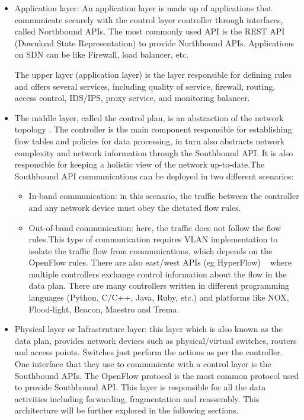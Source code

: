 \documentclass[
  oneside,
  11pt, a4paper,
  footinclude=true,
  headinclude=true,
  cleardoublepage=empty
]{scrbook}
\begin{document}
\begin{itemize}
    \item 
    Application layer: An application layer is made up of applications that communicate securely with the control layer controller through interfaces, called Northbound APIs. The most commonly used API is the REST API (Download State Representation) to provide Northbound APIs. Applications on SDN can be like Firewall, load balancer, etc.
    
    The upper layer (application layer) is the layer responsible for defining rules and offers several services, including quality of service, firewall, routing, access control, IDS/IPS, proxy service, and monitoring balancer.\par
    
    \item
    
    The middle layer, called the control plan, is an abstraction of the network topology . The controller is the main component responsible for establishing flow tables and policies for data processing, in turn also abstracts network complexity and network information through the Southbound API. It is also responsible for keeping  a holistic view of the network up-to-date.The Southbound API communications can be deployed in two different scenarios:

\begin{itemize}
    \item 
    In-band communication: in this scenario, the traffic between the controller and any network device must obey the dictated flow rules. \par
    \item Out-of-band communication: here, the traffic does not follow the flow rules.This type of communication requires VLAN implementation to isolate the traffic flow from communications, which depends on the OpenFlow rules. There are also east/west APIs (eg HyperFlow) ~\cite{hyperflow} where multiple controllers exchange control information about the flow in the data plan. There are many controllers written in different programming languages (Python, C/C++, Java, Ruby, etc.) and platforms like NOX, Flood-light, Beacon, Maestro and Trema.
\end{itemize}

    \item
    Physical layer or Infrastruture layer: this layer which is also known as the data plan, provides network devices such as physical/virtual switches, routers and access points. Switches just perform the actions as per the controller. One interface that they use to communicate with a control layer is the Southbound APIs. The OpenFlow protocol is the most common protocol used to provide Southbound API.
    This layer is responsible for all the data activities including forwarding, fragmentation and reassembly. 
This architecture will be further explored in the following sections.\par
\end{itemize}
\end{document}
